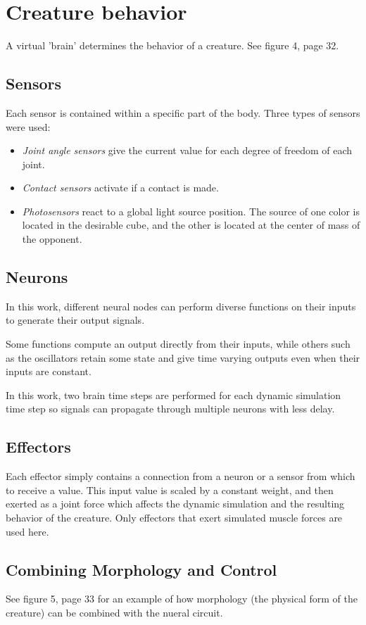 \documentclass[12pt]{book}
\begin{document}
\section{Creature behavior}
A virtual 'brain' determines the behavior of a creature. See figure 4, page 32.

\subsection{Sensors}
Each sensor is contained within a specific part of the body. Three types of sensors were used:
\begin{itemize}
\item \textit{Joint angle sensors} give the current value for each degree of freedom of each joint.
\item \textit{Contact sensors} activate if a contact is made.
\item \textit{Photosensors} react to a global light source position. The source of one color is located in the desirable cube, and the other is located at the center of mass of the opponent.
\end{itemize}

\subsection{Neurons}
In this work, different neural nodes can perform diverse functions on their inputs to generate their output signals.

Some functions compute an output directly from their inputs, while others such as the oscillators retain some state and give time varying outputs even when their inputs are constant.

In this work, two brain time steps are performed for each dynamic simulation time step so signals can propagate through multiple neurons with less delay.

\subsection{Effectors}
Each effector simply contains a connection from a neuron or a sensor from which to receive a value. This input value is scaled by a constant weight, and then exerted as a joint force which affects the dynamic simulation and the resulting behavior of the creature. Only effectors that exert simulated muscle forces are used here.

\subsection{Combining Morphology and Control}
See figure 5, page 33 for an example of how morphology (the physical form of the creature) can be combined with the nueral circuit.
\end{document}
